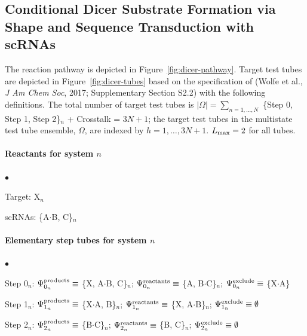 \documentclass[11pt]{article}
\newcommand{\blist}{
 \begin{list}{$\bullet$}
 { \setlength{\itemsep}{2pt}
     \setlength{\parsep}{0pt}
     \setlength{\topsep}{6pt}
 } }
\newcommand{\elist}{
  \end{list}  }
\def\sub#1{$_{#1}$}
\newcommand{\plex}{$\cdot$}
\begin{document}
\subsection*{Conditional Dicer Substrate Formation via Shape and Sequence Transduction with scRNAs}
The reaction pathway is depicted in Figure~\ref{fig:dicer-pathway}. 
Target test tubes are depicted in Figure~\ref{fig:dicer-tubes} based on the specification of (Wolfe et al., {\it J Am Chem Soc}, 2017; Supplementary Section S2.2) with the following definitions. 
The total number of target test tubes is $|\Omega| = \sum_{n=1,\dots,N}$ \{Step 0, Step 1, Step 2\}$_n$  + Crosstalk = $3N + 1$; 
the target test tubes in the multistate test tube ensemble, $\Omega$, are indexed by $h = 1,\dots,3N+1$. $L_{\rm max} = 2$ for 
all tubes.


\paragraph{\bf Reactants for system $n$}
\blist
\item Target: X\sub{n}
\item scRNAs: \{A\plex B, C\}\sub{n}
\elist


\paragraph{\bf Elementary step tubes for system $n$}
\blist
\item Step 0\sub{n}: $\Psi^{\rm products}_{0_n} \equiv$ \{X, A\plex B, C\}\sub{n}; $\Psi^{\rm reactants}_{0_n} \equiv$ \{A, B\plex C\}\sub{n};  $\Psi^{\rm exclude}_{0_n}\equiv$ \{X\plex A\}
\item Step 1$_n$: $\Psi^{\rm products}_{1_n} \equiv$ \{X\plex A, B\}$_n$; $\Psi^{\rm reactants}_{1_n} \equiv$ \{X, A\plex B\}$_n$;  $\Psi^{\rm exclude}_{1_n}\equiv \emptyset$  
\item Step 2$_n$: $\Psi^{\rm products}_{2_n} \equiv$ \{B\plex C\}$_n$; $\Psi^{\rm reactants}_{2_n} \equiv$ \{B, C\}$_n$;  $\Psi^{\rm exclude}_{2_n}\equiv \emptyset$ 
\elist
\end{document}
